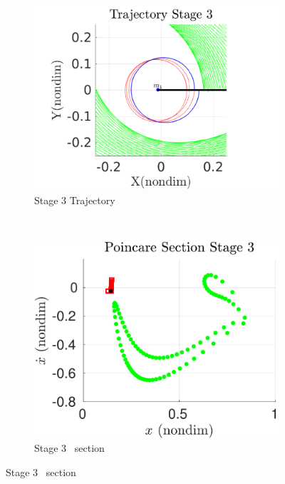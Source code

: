 \documentclass[smallcondensed]{svjour3}
\begin{document}
\begin{figure}[htbp]
    \begin{subfigure}[htbp]{0.5\textwidth} 
        \includegraphics[width=\textwidth, keepaspectratio]{figures/geo_transfer/stage3_trajectory_zoom.pdf} 
        \caption{Stage 3 Trajectory~\label{fig:stage3_trajecotry_zoom}} 
    \end{subfigure}~
    \begin{subfigure}[htbp]{0.5\textwidth} 
        \includegraphics[width=\textwidth, keepaspectratio]{figures/geo_transfer/stage3_poincare.pdf} 
        \caption{Stage 3 \Poincare~section \label{fig:stage3_poincare}} 
    \end{subfigure}
 

\end{figure}
\end{document}
